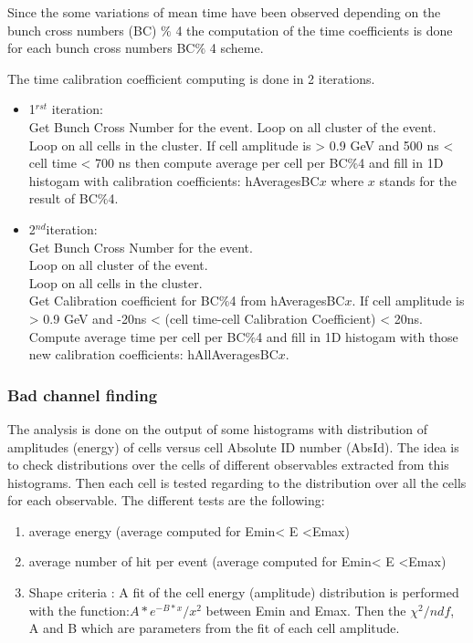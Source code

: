 Since the some variations of mean time have been observed depending on the bunch cross numbers (BC) $\%$ 4 the computation of the time coefficients is done for each bunch cross numbers BC$\%$ 4 scheme.

The time calibration coefficient computing is done in 2 iterations. 
\begin{itemize}
\item 1$^{rst}$  iteration:\\
Get Bunch Cross Number for the event.
Loop on all cluster of the event. \\ Loop on all cells in the cluster.
If cell amplitude is > 0.9 GeV and 500 ns < cell time < 700 ns then 
compute average per cell per BC$\%$4 and fill in 1D histogam with calibration coefficients: hAveragesBC$x$ where $x$ stands for the result of BC$\%$4.
\item 2$^{nd}$iteration:\\
Get Bunch Cross Number for the event.\\ 
Loop on all cluster of the event. \\ Loop on all cells in the cluster.\\ 
Get Calibration coefficient for BC$\%$4 from  hAveragesBC$x$.  If cell amplitude is > 0.9 GeV and -20ns < (cell time-cell Calibration Coefficient)  < 20ns.\\
Compute average time per cell per BC$\%$4 and fill in 1D histogam with those new calibration coefficients: hAllAveragesBC$x$.
\end{itemize}

\subsubsection{Bad channel finding}

The analysis is done on the output of some histograms with distribution of amplitudes (energy) of cells versus cell Absolute ID number (AbsId). The idea is to check distributions over the cells of different observables extracted from this histograms. Then each cell is tested regarding to the distribution over all the cells for each observable. The different tests are the following:

\begin{enumerate}
\item average energy (average computed for Emin< E  <Emax) 
\item average number of hit per event  (average computed for Emin< E  <Emax)
\item Shape criteria : A fit of the cell energy (amplitude) distribution is performed with the function:$A*e^{-B*x}/x^2$ between Emin and Emax.  Then the  $\chi^{2}/ndf$, A  and B which are parameters from the fit of each cell amplitude. 
\end{enumerate}

